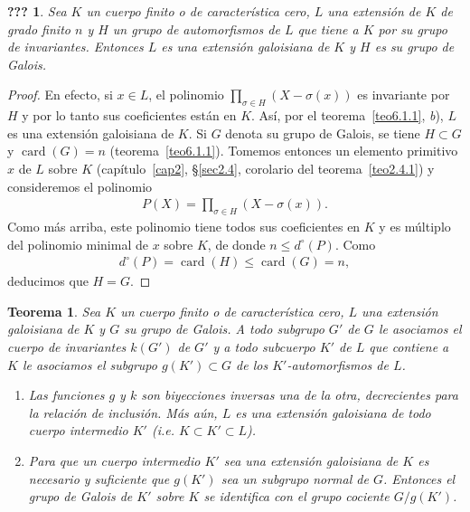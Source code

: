 \documentclass[10pt,oneside,bibtotoc,smallheadings,leqno,a5paper,DIV=12]{scrbook}
\newcommand{\QED}{}%
\DeclareMathOperator{\card}{card}
\numberwithin{equation}{section}
\theoremstyle{defi}
\theoremstyle{enonce}
\newtheorem{theorem}{Teorema}
\newcommand{\namedname}{???}
\newtheorem*{namedthm}{\namedname}
\newenvironment{named}[1]%
	{\renewcommand{\namedname}{#1}%
	\begin{namedthm}}%
	{\end{namedthm}}
\theoremstyle{rem}
\numberwithin{theorem}{section}
\numberwithin{proposition}{section}
\numberwithin{definition}{section}
\numberwithin{lemma}{section}
\numberwithin{corollary}{section}
\numberwithin{example}{section}
\numberwithin{footnote}{section}%
\begin{document}
\begin{named}{Corolario del teorema 1}
Sea $K$ un cuerpo finito o de caracter\'istica cero, $L$ una extensi\'on de $K$ de grado finito $n$ y
$H$ un grupo de automorfismos de $L$ que tiene a $K$ por su grupo de invariantes. Entonces $L$ es una
extensi\'on galoisiana de $K$ y $H$ es su grupo de Galois.
\end{named}

\begin{proof}
En efecto, si $x\in L$, el polinomio $\prod_{\sigma\in H}(X-\sigma(x))$ es invariante
por $H$ y por
lo tanto sus coeficientes est\'an en $K$. As\'i, por el
teorema~\ref{teo6.1.1}, {\itshape b}), $L$ es una extensi\'on
galoisiana de $K$. Si $G$ denota su grupo de Galois, se tiene $H\subset G$ y $\card(G) = n$
(teorema~\ref{teo6.1.1}). Tomemos entonces un elemento primitivo $x$ de $L$ sobre $K$
(cap\'itulo~\ref{cap2},
\S\ref{sec2.4}, corolario del teorema~\ref{teo2.4.1}) y consideremos el polinomio
\begin{gather*}
P(X) = \prod_{\sigma\in H}(X-\sigma(x)).
\end{gather*}
Como m\'as arriba, este polinomio tiene todos sus coeficientes en $K$ y es m\'ultiplo
del polinomio minimal
de $x$ sobre $K$, de donde $n\leq d^{\circ}(P)$. Como
\begin{gather*}
d^{\circ}(P) = \card(H)\leq\card(G) = n,
\end{gather*}
deducimos que $H = G$. \QED
\end{proof}

\begin{theorem}\label{teo6.1.2}
Sea $K$ un cuerpo finito o de caracter\'istica cero, $L$ una extensi\'on galoisiana de $K$
y $G$ su grupo
de Galois. A todo subgrupo $G'$ de $G$ le asociamos  el cuerpo de invariantes $k(G')$
de $G'$ y a todo
subcuerpo $K'$ de $L$ que contiene a $K$ le asociamos el subgrupo $g(K')\subset G$ de
los $K'$-automorfismos
de $L$.
\begin{enumerate}%
\item[a)] Las funciones $g$ y $k$ son biyecciones inversas una de la otra, decrecientes
para la relaci\'on de
inclusi\'on. M\'as a\'un, $L$ es una extensi\'on galoisiana de todo cuerpo intermedio $K'$
(i.e. $K\subset K'\subset L$).
\item[b)] Para que un cuerpo intermedio $K'$ sea una extensi\'on galoisiana de $K$ es
necesario y suficiente que
$g(K')$ sea un subgrupo normal de $G$. Entonces el grupo de Galois de $K'$ sobre $K$
se identifica con el
grupo cociente $G/g(K')$.
\end{enumerate}%
\end{theorem}
\end{document}
